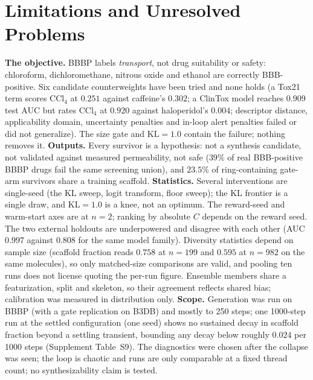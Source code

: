 \documentclass[10pt,letterpaper]{article}
\begin{document}
\section{Limitations and Unresolved Problems}\label{sec:limits}
\textbf{The objective.} BBBP labels \emph{transport}, not drug suitability or safety: chloroform, dichloromethane, nitrous oxide and ethanol are correctly BBB-positive. Six candidate counterweights have been tried and none holds (a Tox21 term scores CCl$_4$ at $0.251$ against caffeine's $0.302$; a ClinTox model reaches $0.909$ test AUC but rates CCl$_4$ at $0.920$ against haloperidol's $0.004$; descriptor distance, applicability domain, uncertainty penalties and in-loop alert penalties failed or did not generalize). The size gate and $\mathrm{KL}=1.0$ contain the failure; nothing removes it. \textbf{Outputs.} Every survivor is a hypothesis: not a synthesis candidate, not validated against measured permeability, not safe ($39\%$ of real BBB-positive BBBP drugs fail the same screening union), and $23.5\%$ of ring-containing gate-arm survivors share a training scaffold. \textbf{Statistics.} Several interventions are single-seed (the KL sweep, logit transform, floor sweep); the KL frontier is a single draw, and $\mathrm{KL}=1.0$ is a knee, not an optimum. The reward-seed and warm-start axes are at $n=2$; ranking by absolute $C$ depends on the reward seed. The two external holdouts are underpowered and disagree with each other (AUC $0.997$ against $0.808$ for the same model family). Diversity statistics depend on sample size (scaffold fraction reads $0.758$ at $n=199$ and $0.595$ at $n=982$ on the same molecules), so only matched-size comparisons are valid, and pooling ten runs does not license quoting the per-run figure. Ensemble members share a featurization, split and skeleton, so their agreement reflects shared bias; calibration was measured in distribution only. \textbf{Scope.} Generation was run on BBBP (with a gate replication on B3DB) and mostly to 250 steps; one 1000-step run at the settled configuration (one seed) shows no sustained decay in scaffold fraction beyond a settling transient, bounding any decay below roughly $0.024$ per 1000 steps (Supplement Table~S9). The diagnostics were chosen after the collapse was seen; the loop is chaotic and runs are only comparable at a fixed thread count; no synthesizability claim is tested.
\end{document}
